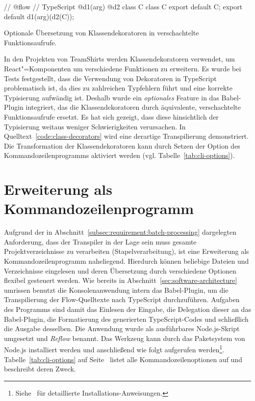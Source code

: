 {\bigbreak
\begin{listing}[htb]
\begin{textcode}
// @flow                                        // TypeScript
@d1(arg)
@d2
class C {}                                      class C {}
export default C;                               export default d1(arg)(d2(C));
\end{textcode}
\listingvspace
\caption{Optionale Übersetzung von Klassendekoratoren in verschachtelte Funktionsaufrufe.}
\label{code:class-decorators}
\end{listing}

In den Projekten von TeamShirts werden Klassendekoratoren verwendet, um React"=Komponenten um verschiedene Funktionen zu erweitern. Es wurde bei Tests festgestellt, dass die Verwendung von Dekoratoren in TypeScript problematisch ist, da dies zu zahlreichen Typfehlern führt und eine korrekte Typisierung aufwändig ist. Deshalb wurde ein \emph{optionales} Feature in das Babel-Plugin integriert, das die Klassendekoratoren durch äquivalente, verschachtelte Funktionsaufrufe ersetzt. Es hat sich gezeigt, dass diese hinsichtlich der Typisierung weitaus weniger Schwierigkeiten verursachen. In Quelltext~\ref{code:class-decorators} wird eine derartige Transpilierung demonstriert. Die Transformation der Klassendekoratoren kann durch Setzen der Option  des Kommandozeilenprogramms aktiviert werden (vgl. Tabelle~\ref{tab:cli-options}).

\section{Erweiterung als Kommandozeilenprogramm}
\label{sec:cli-program}

Aufgrund der in Abschnitt~\ref{subsec:requirement:batch-processing} dargelegten Anforderung, dass der Transpiler in der Lage sein muss gesamte Projektverzeichnisse zu verarbeiten (Stapelverarbeitung), ist eine Erweiterung als Kommandozeilenprogramm naheliegend. Hierdurch können beliebige Dateien und Verzeichnisse eingelesen und deren Übersetzung durch verschiedene Optionen flexibel gesteuert werden. Wie bereits in Abschnitt~\ref{sec:software-architecture} umrissen benutzt die Konsolenanwendung intern das Babel-Plugin, um die Transpilierung der Flow-Quelltexte nach TypeScript durchzuführen. Aufgaben des Programms sind damit das Einlesen der Eingabe, die Delegation dieser an das Babel-Plugin, die Formatierung des generierten TypeScript-Codes und schließlich die Ausgabe desselben.
Die Anwendung wurde als ausführbares Node.js-Skript umgesetzt und \textit{Reflow} benannt. Das Werkzeug kann durch das Paketsystem von Node.js installiert werden und anschließend wie folgt aufgerufen werden\footnote{Siehe~\autocite{REFLOW_GITHUB} für detaillierte Installations-Anweisungen.}. Tabelle~\ref{tab:cli-options} auf Seite~\pageref{tab:cli-options} listet alle Kommandozeilenoptionen auf und beschreibt deren Zweck.

}
